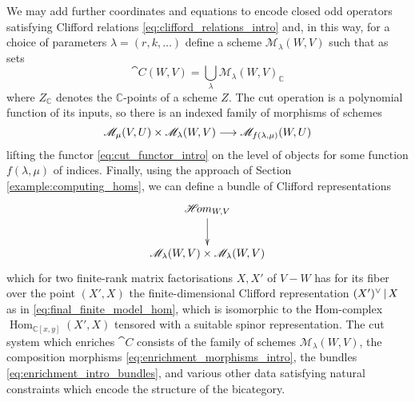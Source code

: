 \documentclass[english,letter paper,12pt,leqno]{article}
\theoremstyle{example}
\numberwithin{equation}{section}
\def\LG{\mathcal{LG}}
\def\Hom{\operatorname{Hom}}
\def\be{\begin{equation}}
\def\ee{\end{equation}}
\def\nC{\mathds{C}}
\def\L{\mathcal{C}}
\begin{document}
We may add further coordinates and equations to encode closed odd operators satisfying Clifford relations \eqref{eq:clifford_relations_intro} and, in this way, for a choice of parameters $\lambda = (r, k, \ldots)$ define a scheme $\mathscr{M}_{\lambda}(W,V)$ such that as sets
\begin{equation}\label{eq:param_frmf}
\cat{C}(W,V) = \bigcup_{\lambda} \mathscr{M}_{\lambda}(W,V)_{\nC}
\end{equation}
where $Z_{\nC}$ denotes the $\nC$-points of a scheme $Z$. The cut operation is a polynomial function of its inputs, so there is an indexed family of morphisms of schemes
\be\label{eq:enrichment_morphisms_intro}
\mathscr{M}_\mu(V,U) \times \mathscr{M}_\lambda(W,V) \lto \mathscr{M}_{f(\lambda, \mu)}(W, U)
\ee
lifting the functor \eqref{eq:cut_functor_intro} on the level of objects for some function $f(\lambda, \mu)$ of indices. Finally, using the approach of Section \ref{example:computing_homs}, we can define a bundle of Clifford representations
\be\label{eq:enrichment_intro_bundles}
\xymatrix{
\mathscr{H}\! om_{W,V} \ar[d]\\
\mathscr{M}_\lambda(W,V) \times \mathscr{M}_\lambda(W,V)
}
\ee
which for two finite-rank matrix factorisations $X,X'$ of $V - W$ has for its fiber over the point $(X',X)$ the finite-dimensional Clifford representation $(X')^{\vee} \,|\, X$ as in \eqref{eq:final_finite_model_hom}, which is isomorphic to the Hom-complex $\Hom_{\nC[x,y]}(X',X)$ tensored with a suitable spinor representation. The cut system which enriches $\cat{C}$ consists of the family of schemes $\mathscr{M}_\lambda(W,V)$, the composition morphisms \eqref{eq:enrichment_morphisms_intro}, the bundles \eqref{eq:enrichment_intro_bundles}, and various other data satisfying natural constraints which encode the structure of the bicategory.




\end{document}
